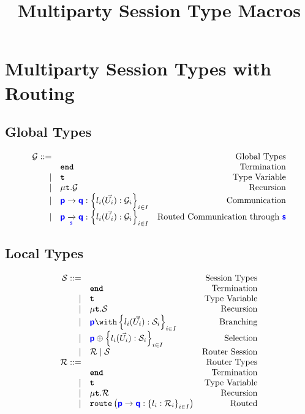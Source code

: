 \documentclass{article}
\title{Multiparty Session Type Macros}
\begin{document}
\maketitle

\section{Multiparty Session Types with Routing}

\subsection{Global Types}
\doublespacing
\[
\begin{array}{rlr}
	\newglobal ::= & & \text{Global Types} \\
     & \tyend & \text{Termination} \\
	\mid & \tyrecvar & \text{Type Variable} \\
	\mid & \tyrec{\newglobal} & \text{Recursion} \\
	\mid & \gcomm{p}{q}{l_i(\vec{U_i}): \newglobal_i}{i \in I} & \text{Communication} \\
	\mid & \gcommroute{p}{q}{s}{l_i(\vec{U_i}): \newglobal_i}{i \in I} & \text{Routed Communication through $\role{s}$} \\
\end{array}
\]
\singlespacing

\subsection{Local Types}
\doublespacing
\[
\begin{array}{rlr}
    \newlocal ::= & & \text{Session Types} \\
     & \tyend & \text{Termination} \\
     	\mid & \tyrecvar & \text{Type Variable} \\
     	\mid & \tyrec{\newlocal} & \text{Recursion} \\
		\mid & \tybra{p}{l_i(\vec{U_i}): \newlocal_i}{i \in I} & \text{Branching} \\
		\mid & \tysel{p}{l_i(\vec{U_i}): \newlocal_i}{i \in I} & \text{Selection} \\
		\mid & \tyroutepar{\newroute}{\newlocal} & \text{Router Session} \\
	\newroute ::= & & \text{Router Types} \\
	 & \tyend & \text{Termination} \\
     	\mid & \tyrecvar & \text{Type Variable} \\
     	\mid & \tyrec{\newroute} & \text{Recursion} \\
     	\mid & \tyroute{p}{q}{l_i: \newroute_i}{i \in I} & \text{Routed} \\
\end{array}
\]
\singlespacing
\end{document}
